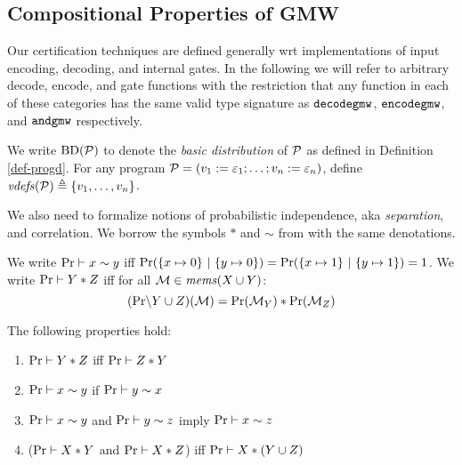 \subsection{Compositional Properties of GMW}



Our certification techniques are defined generally wrt implementations
of input encoding, decoding, and internal gates. In the following we
will refer to arbitrary decode, encode, and gate functions with the
restriction that any function in each of these categories has the same
valid type signature as $\texttt{decodegmw}$, $\texttt{encodegmw}$, and
$\texttt{andgmw}$ respectively.
\begin{definition}
  We write $\mathrm{BD}(\mathcal{P})$ to denote the \emph{basic distribution} of
  $\mathcal{P}$ as defined in Definition \ref{def-progd}. For any program $\mathcal{P} =
  (v_1 := \varepsilon_1;\ldots;v_n := \varepsilon_n)$, define
  $\mathit{vdefs}(\mathcal{P}) \triangleq \{ v_1,\ldots,v_n \}$.
\end{definition}
We also need to formalize notions of probabilistic independence, aka
\emph{separation}, and correlation. We borrow the symbols $*$ and $\sim$
from \cite{barthe2019probabilistic} with the same denotations.
\begin{definition}
  We write $\mathrm{Pr} \vdash x \sim y$ iff $\mathrm{Pr}(\{ x \mapsto 0\}\ |\ \{ y \mapsto 0 \}) =
  \mathrm{Pr}(\{ x \mapsto 1\}\ |\ \{ y \mapsto 1 \}) = 1$.
  We write $\mathrm{Pr} \vdash Y * Z$ iff for all
    $\mathcal{M} \in \mathit{mems}(X \cup Y)$:
  $$(\mathrm{Pr}\backslash Y \cup Z)(\mathcal{M}) =
  \mathrm{Pr}(\mathcal{M}_Y) * \mathrm{Pr}(\mathcal{M}_Z)$$ 
\end{definition}

\begin{lemma}
  \label{lemma-separation}
  The following properties hold:
  \begin{enumerate}
  \item $\mathrm{Pr} \vdash Y * Z$ iff $\mathrm{Pr} \vdash Z * Y$
  \item $\mathrm{Pr} \vdash x \sim y$ if  $\mathrm{Pr} \vdash y \sim x$
  \item $\mathrm{Pr} \vdash x \sim y$ and $\mathrm{Pr} \vdash y \sim z$ imply $\mathrm{Pr} \vdash x \sim z$
  \item ($\mathrm{Pr} \vdash X * Y$ and $\mathrm{Pr} \vdash X * Z$) iff $\mathrm{Pr} \vdash X * (Y \cup Z)$
  \end{enumerate}
\end{lemma}

